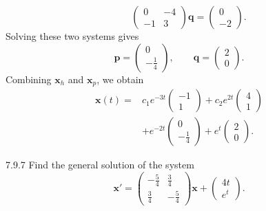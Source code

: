 \documentclass[11pt,oneside]{article}
\begin{document}
\begin{solution}
\[    \qquad
    \begin{pmatrix}0&-4\\-1&3\end{pmatrix}\mathbf{q}
       =\begin{pmatrix}0\\-2\end{pmatrix}.
\]
Solving these two systems gives
\[
    \mathbf{p}=\begin{pmatrix}0\\-\frac14\end{pmatrix},
    \qquad
    \mathbf{q}=\begin{pmatrix}2\\0\end{pmatrix}.
\]
Combining $\mathbf{x}_h$ and $\mathbf{x}_p$, we obtain
\[
    \boxed{\begin{aligned}
       \mathbf{x}(t)={}&c_1e^{-3t}\begin{pmatrix}-1\\1\end{pmatrix}
        +c_2e^{2t}\begin{pmatrix}4\\1\end{pmatrix}\\
        &+e^{-2t}\begin{pmatrix}0\\-\frac14\end{pmatrix}
        +e^t\begin{pmatrix}2\\0\end{pmatrix}.
    \end{aligned}}
\]
\end{solution}

\begin{problem}{7.9.7}
Find the general solution of the system
\[
    \mathbf{x}'=
    \begin{pmatrix}
        -\frac54&\frac34\\
        \frac34&-\frac54
    \end{pmatrix}\mathbf{x}
    +\begin{pmatrix}4t\\e^t\end{pmatrix}.
\]
\end{problem}
\end{document}
